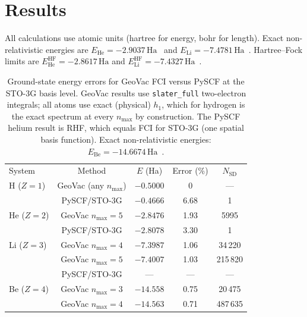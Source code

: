 \documentclass[aps,pra,twocolumn,superscriptaddress,longbibliography,floatfix]{revtex4-2}
\begin{document}
\section{Results}
\label{sec:results}

All calculations use atomic units (hartree for energy, bohr for
length).
Exact non-relativistic energies are $E_{\text{He}} = -2.9037\,\text{Ha}$~\cite{Pekeris1958}
and $E_{\text{Li}} = -7.4781\,\text{Ha}$~\cite{ChakravortyDavidson1993}.
Hartree--Fock limits are $E_{\text{He}}^{\text{HF}} = -2.8617\,\text{Ha}$
and $E_{\text{Li}}^{\text{HF}} = -7.4327\,\text{Ha}$~\cite{Fischer1977}.

\begin{table}
\caption{\label{tab:comparison}%
Ground-state energy errors for GeoVac FCI versus PySCF at the STO-3G
basis level.
GeoVac results use \texttt{slater\_full} two-electron integrals;
all atoms use exact (physical) $h_1$, which for hydrogen is the exact
spectrum at every $n_{\max}$ by construction.
The PySCF helium result is RHF, which equals FCI for STO-3G
(one spatial basis function).
Exact non-relativistic energies: $E_{\text{Be}} = -14.6674\,\text{Ha}$~\cite{ChakravortyDavidson1993}.}
\begin{ruledtabular}
\begin{tabular}{lcccc}
System & Method & $E$ (Ha) & Error (\%) & $N_{\text{SD}}$ \\
\colrule
H ($Z\!=\!1$) & GeoVac (any $n_{\max}$) & $-0.5000$ & 0 & --- \\
              & PySCF/STO-3G & $-0.4666$ & 6.68 & 1 \\
\colrule
He ($Z\!=\!2$) & GeoVac $n_{\max}\!=\!5$ & $-2.8476$ & 1.93 & 5995 \\
               & PySCF/STO-3G & $-2.8078$ & 3.30 & 1 \\
\colrule
Li ($Z\!=\!3$) & GeoVac $n_{\max}\!=\!4$ & $-7.3987$ & 1.06 & 34\,220 \\
               & GeoVac $n_{\max}\!=\!5$ & $-7.4007$ & 1.03 & 215\,820 \\
               & PySCF/STO-3G & --- & --- & --- \\
\colrule
Be ($Z\!=\!4$) & GeoVac $n_{\max}\!=\!3$ & $-14.558$ & 0.75 & 20\,475 \\
               & GeoVac $n_{\max}\!=\!4$ & $-14.563$ & 0.71 & 487\,635 \\
\end{tabular}
\end{ruledtabular}
\end{table}
\end{document}
